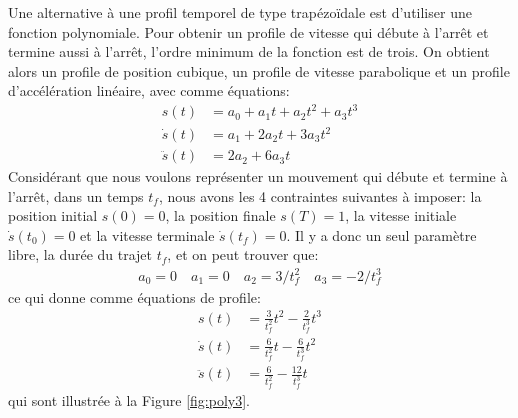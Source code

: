 Une alternative à une profil temporel de type trapézoïdale est d'utiliser une fonction polynomiale. Pour obtenir un profile de vitesse qui débute à l'arrêt et termine aussi à l'arrêt, l'ordre minimum de la fonction est de trois. On obtient alors un profile de position cubique, un profile de vitesse parabolique et un profile d'accélération linéaire, avec comme équations:
\begin{align}
s(t) &= a_0 + a_1 t + a_2 t^2 + a_3 t^3
\\
\dot{s}(t)&= a_1 + 2 a_2 t + 3 a_3 t^2
\\
\ddot{s}(t) &= 2 a_2 + 6 a_3 t 
\end{align}
Considérant que nous voulons représenter un mouvement qui débute et termine à l'arrêt, dans un temps $t_f$, nous avons les 4 contraintes suivantes à imposer: la position initial $s(0)=0$, la position finale $s(T)=1$, la vitesse initiale $\dot{s}(t_0)=0$ et la vitesse terminale $\dot{s}(t_f) = 0$. Il y a donc un seul paramètre libre, la durée du trajet $t_f$, et on peut trouver que:
\begin{align}
a_0 = 0  \quad a_1 = 0  \quad a_2 = 3/t_f^2  \quad a_3 = -2/t_f^3 
\end{align}
ce qui donne comme équations de profile:
\begin{align}
s(t) &=  \frac{3}{t_f^2}  t^2 -\frac{2}{t_f^3}  t^3
\\
\dot{s}(t)&= \frac{6}{t_f^2} t -\frac{6}{t_f^3}  t^2
\\
\ddot{s}(t) &= \frac{6}{t_f^2} -\frac{12}{t_f^3}  t 
\end{align}
qui sont illustrée à la Figure \ref{fig:poly3}.
